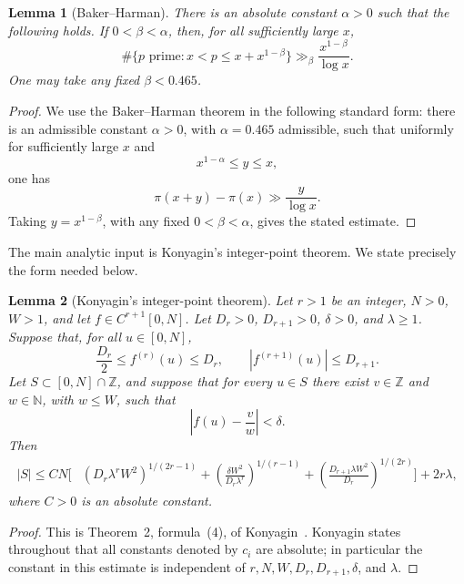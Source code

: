 \documentclass[11pt]{article}
\newtheorem{lemma}{Lemma}
\newcommand{\ZZ}{\mathbb Z}
\newcommand{\NN}{\mathbb N}
\begin{document}
\begin{lemma}[Baker--Harman]
\label{lem:short-primes}
There is an absolute constant \(\alpha>0\) such that the following holds. If
\(0<\beta<\alpha\), then, for all sufficiently large \(x\),
\[
        \#\{p\text{ prime}:x<p\le x+x^{1-\beta}\}
        \gg_\beta
        \frac{x^{1-\beta}}{\log x}.
\]
One may take any fixed \(\beta<0.465\).
\end{lemma}

\begin{proof}
We use the Baker--Harman theorem \cite{BakerHarman} in the following standard
form: there is an admissible constant \(\alpha>0\), with \(\alpha=0.465\)
admissible, such that uniformly for sufficiently large \(x\) and
\[
        x^{1-\alpha}\le y\le x,
\]
one has
\[
        \pi(x+y)-\pi(x)\gg \frac{y}{\log x}.
\]
Taking \(y=x^{1-\beta}\), with any fixed \(0<\beta<\alpha\), gives the stated
estimate.
\end{proof}

The main analytic input is Konyagin's integer-point theorem. We state precisely
the form needed below.

\begin{lemma}[Konyagin's integer-point theorem]
\label{lem:konyagin-original}
Let \(r>1\) be an integer, \(N>0\), \(W>1\), and let
\(f\in C^{r+1}[0,N]\). Let \(D_r>0\), \(D_{r+1}>0\), \(\delta>0\), and
\(\lambda\ge1\). Suppose that, for all \(u\in[0,N]\),
\[
        \frac{D_r}{2}\le f^{(r)}(u)\le D_r,
        \qquad
        |f^{(r+1)}(u)|\le D_{r+1} .
\]
Let \(S\subset[0,N]\cap\ZZ\), and suppose that for every \(u\in S\) there
exist \(v\in\ZZ\) and \(w\in\NN\), with \(w\le W\), such that
\[
        \left|f(u)-\frac vw\right|<\delta .
\]
Then
\[
\begin{aligned}
        |S|
        \le C N\bigg[&
        (D_r\lambda^rW^2)^{1/(2r-1)}
        +
        \left(\frac{\delta W^2}{D_r\lambda^r}\right)^{1/(r-1)}
        +
        \left(\frac{D_{r+1}\lambda W^2}{D_r}\right)^{1/(2r)}
        \bigg]
        +2r\lambda,
\end{aligned}
\]
where \(C>0\) is an absolute constant.
\end{lemma}

\begin{proof}
This is Theorem~2, formula~(4), of Konyagin~\cite{Konyagin}. Konyagin states
throughout that all constants denoted by \(c_i\) are absolute; in particular
the constant in this estimate is independent of
\(r,N,W,D_r,D_{r+1},\delta\), and \(\lambda\).
\end{proof}
\end{document}
